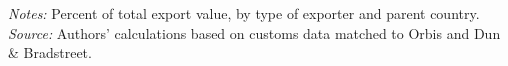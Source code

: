 \documentclass[11pt,a4paper]{article}
\begin{document}
\begin{table}[H]\centering\small%
  \caption{Share of Total Exports, by Parent Country}%
  \label{tab:f4tn_all}%
  \par\vspace{3pt}%
  \begin{minipage}{0.95\textwidth}\footnotesize %
  \textit{Notes:} Percent of total export value, by type of exporter and parent country.\\[3pt]%
  \textit{Source:} Authors' calculations based on customs data matched to Orbis and Dun \& Bradstreet.%
  \end{minipage}%
  \end{table}
\end{document}
